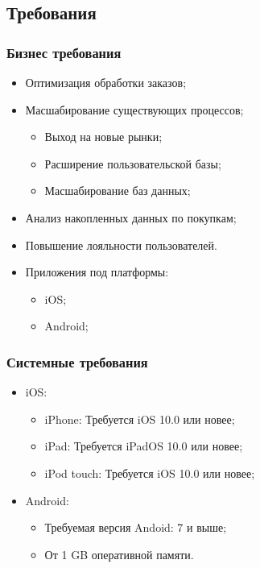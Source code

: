 \documentclass[a4paper,8pt]{article}
\begin{document}
\subsection{Требования}

\subsubsection{Бизнес требования}


    \begin{itemize}
        \item Оптимизация обработки заказов;
        \item Масшабирование существующих процессов;
            \begin{itemize}
                \item Выход на новые рынки;
                \item Расширение пользовательской базы;
                \item Масшабирование баз данных;
            \end{itemize}
        \item Анализ накопленных данных по покупкам;
        \item Повышение лояльности пользователей.
        \item Приложения под платформы:
            \begin{itemize}
                \item iOS;
                \item Android;
            \end{itemize}

    \end{itemize}


\subsubsection{Системные требования}
    \begin{itemize}
        \item iOS:
            \begin{itemize}
                \item iPhone: Требуется iOS 10.0 или новее;
                \item iPad: Требуется iPadOS 10.0 или новее;
                \item iPod touch: Требуется iOS 10.0 или новее;
            \end{itemize}
        \item Android:
            \begin{itemize}
                \item Требуемая версия Andoid: 7 и выше;
                \item От 1 GB оперативной памяти.
            \end{itemize}
    \end{itemize}
\end{document}
